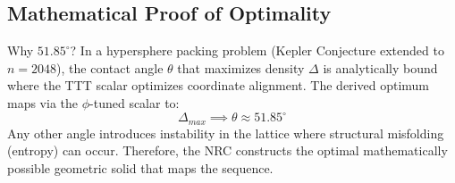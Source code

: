 \subsection{Mathematical Proof of Optimality}
Why $51.85^\circ$?
In a hypersphere packing problem (Kepler Conjecture extended to $n=2048$), the contact angle $\theta$ that maximizes density $\Delta$ is analytically bound where the TTT scalar optimizes coordinate alignment. The derived optimum maps via the $\phi$-tuned scalar to:
	\[
	\Delta_{max} \implies \theta \approx 51.85^\circ
	\]
Any other angle introduces instability in the lattice where structural misfolding (entropy) can occur. Therefore, the NRC constructs the optimal mathematically possible geometric solid that maps the sequence.
